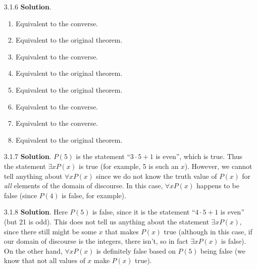 \documentclass[11pt,]{book}
\theoremstyle{ptxplainnotitle}
\theoremstyle{ptxplaintitle}
\theoremstyle{ptxdefinitionnotitle}
\theoremstyle{ptxdefinitiontitle}
\theoremstyle{ptxdefinitionnotitle}
\theoremstyle{ptxdefinitiontitle}
\theoremstyle{ptxdefinitionnotitle}
\theoremstyle{ptxdefinitiontitle}
\theoremstyle{ptxdefinitiontitlenonumber}
\theoremstyle{ptxdefinitiontitlenonumber}
\numberwithin{equation}{chapter}
\begin{document}
\begin{divisionexercise}{3.1.6}
\textbf{Solution}.\quad%
\hypertarget{p-2038}{}%
\leavevmode%
\begin{enumerate}[label=\alph*.]
\item\hypertarget{li-996}{}\hypertarget{p-2039}{}%
Equivalent to the converse.%
\item\hypertarget{li-997}{}\hypertarget{p-2040}{}%
Equivalent to the original theorem.%
\item\hypertarget{li-998}{}\hypertarget{p-2041}{}%
Equivalent to the converse.%
\item\hypertarget{li-999}{}\hypertarget{p-2042}{}%
Equivalent to the original theorem.%
\item\hypertarget{li-1000}{}\hypertarget{p-2043}{}%
Equivalent to the original theorem.%
\item\hypertarget{li-1001}{}\hypertarget{p-2044}{}%
Equivalent to the converse.%
\item\hypertarget{li-1002}{}\hypertarget{p-2045}{}%
Equivalent to the converse.%
\item\hypertarget{li-1003}{}\hypertarget{p-2046}{}%
Equivalent to the original theorem.%
\end{enumerate}
%
\end{divisionexercise}%
\begin{divisionexercise}{3.1.7}
\textbf{Solution}.\quad%
\hypertarget{p-2060}{}%
\(P(5)\) is the statement ``\(3\cdot 5 + 1\) is even'', which is true.  Thus the statement \(\exists x P(x)\) is true (for example, 5 is such an \(x\)).  However, we cannot tell anything about \(\forall x P(x)\) since we do not know the truth value of \(P(x)\) for \emph{all} elements of the domain of discourse.  In this case, \(\forall x P(x)\) happens to be false (since \(P(4)\) is false, for example).%
\end{divisionexercise}%
\begin{divisionexercise}{3.1.8}
\textbf{Solution}.\quad%
\hypertarget{p-2074}{}%
Here \(P(5)\) is false, since it is the statement ``\(4\cdot 5 + 1\) is even'' (but 21 is odd).  This does not tell us anything about the statement \(\exists x P(x)\text{,}\) since there still might be some \(x\) that makes \(P(x)\) true (although in this case, if our domain of discourse is the integers, there isn't, so in fact \(\exists x P(x)\) is false).  On the other hand, \(\forall x P(x)\) is definitely false based on \(P(5)\) being false (we know that not all values of \(x\) make \(P(x)\) true).%
\end{divisionexercise}%
\end{document}
